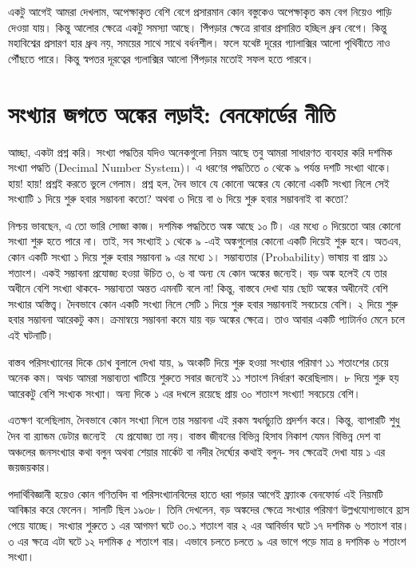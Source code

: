 \documentclass[
]{book}
\begin{document}
একটু আগেই আমরা দেখলাম, অপেক্ষাকৃত বেশি বেগে প্রসারমান কোন বস্তুকেও অপেক্ষাকৃত কম বেগ নিয়েও পাড়ি দেওয়া যায়। কিন্তু আলোর ক্ষেত্রে একটু সমস্যা আছে। পিঁপড়ার ক্ষেত্রে রাবার প্রসারিত হচ্ছিল ধ্রুব বেগে। কিন্তু মহাবিশ্বের প্রসারণ হার ধ্রুব নয়, সময়ের সাথে সাথে বর্ধনশীল। ফলে যথেষ্ট দূরের গ্যালাক্সির আলো পৃথিবীতে নাও পৌঁছতে পারে। কিন্তু স্বপতর দূরত্বের গ্যলাক্সির আলো পিঁপড়ার মতোই সফল হতে পারবে।

\hypertarget{benford}{%
\chapter{সংখ্যার জগতে অঙ্কের লড়াই: বেনফোর্ডের নীতি}\label{benford}}

আচ্ছা, একটা প্রশ্ন করি। সংখ্যা পদ্ধতির যদিও অনেকগুলো নিয়ম আছে তবু আমরা সাধারণত ব্যবহার করি দশমিক সংখ্যা পদ্ধতি (Decimal Number System)। এ ধরণের পদ্ধতিতে ০ থেকে ৯ পর্যন্ত দশটি সংখ্যা থাকে। হায়! হায়! প্রশ্নই করতে ভুলে গেলাম। প্রশ্ন হল, দৈব ভাবে যে কোনো অঙ্কের যে কোনো একটি সংখ্যা নিলে সেই সংখ্যাটি ১ দিয়ে শুরু হবার সম্ভাবনা কতো? অথবা ৩ দিয়ে বা ৬ দিয়ে শুরু হবার সম্ভাবনাই বা কতো?

নিশ্চয় ভাবছেন, এ তো ভারি সোজা কাজ। দশমিক পদ্ধতিতে অঙ্ক আছে ১০ টি। এর মধ্যে ০ দিয়েতো আর কোনো সংখ্যা শুরু হতে পারে না। তাই, সব সংখ্যাই ১ থেকে ৯ -এই অঙ্কগুলোর কোনো একটি দিয়েই শুরু হবে। অতএব, কোন একটি সংখ্যা ১ দিয়ে শুরু হবার সম্ভাবনা ৯ এর মধ্যে ১। সম্ভাব্যতার (Probability) ভাষায় বা প্রায় ১১ শতাংশ। একই সম্ভাবনা প্রযোজ্য হওয়া উচিত ৩, ৬ বা অন্য যে কোন অঙ্কের জন্যেই। বড় অঙ্ক হলেই যে তার অধীনে বেশি সংখ্যা থাকবে- সম্ভাব্যতা অন্তত এমনটি বলে না!
কিন্তু, বাস্তবে দেখা যায় ছোট অঙ্কের অধীনেই বেশি সংখ্যার অস্তিত্ত্ব। দৈবভাবে কোন একটি সংখ্যা নিলে সেটি ১ দিয়ে শুরু হবার সম্ভাবনাই সবচেয়ে বেশি। ২ দিয়ে শুরু হবার সম্ভাবনা আরেকটু কম। ক্রমান্বয়ে সম্ভাবনা কমে যায় বড় অঙ্কের ক্ষেত্রে। তাও আবার একটি প্যাটার্নও মেনে চলে এই ঘটনাটি।~

বাস্তব পরিসংখ্যানের দিকে চোখ বুলালে দেখা যায়, ৯ অংকটি দিয়ে শুরু হওয়া সংখ্যার পরিমাণ ১১ শতাংশের চেয়ে অনেক কম। অথচ আমরা সম্ভাব্যতা খাটিয়ে শুরুতে সবার জন্যেই ১১ শতাংশ নির্ধারণ করেছিলাম। ৮ দিয়ে শুরু হয় আরেকটু বেশি সংখ্যক সংখ্যা। অন্য দিকে ১ এর দখলে রয়েছে প্রায় ৩০ শতাংশ সংখ্যা! সবচেয়ে বেশি।

এতক্ষণ বলেছিলাম, দৈবভাবে কোন সংখ্যা নিলে তার সম্ভাবনা এই রকম স্বধর্মচ্যুতি প্রদর্শন করে। কিন্তু, ব্যাপারটি শুধু দৈব বা র‍্যান্ডম ডেটার জন্যেই~ যে প্রযোজ্য তা নয়। বাস্তব জীবনের বিভিন্ন হিসাব নিকাশ যেমন বিভিন্ন দেশ বা অঞ্চলের জনসংখ্যার কথা বলুন অথবা শেয়ার মার্কেট বা নদীর দৈর্ঘ্যের কথাই বলুন- সব ক্ষেত্রেই দেখা যায় ১ এর জয়জয়কার।~

পদার্থিবিজ্ঞানী হয়েও কোন গণিতবিদ বা পরিসংখ্যানবিদের হাতে ধরা পড়ার আগেই ফ্র্যাংক বেনফোর্ড এই নিয়মটি আবিষ্কার করে ফেলেন। সালটি ছিল ১৯৩৮। তিনি দেখলেন, বড় অঙ্কদের ক্ষেত্রে সংখ্যার পরিমাণ উল্লখযোগ্যভাবে হ্রাস পেয়ে যাচ্ছে। সংখ্যার শুরুতে ১ এর আগমণ ঘটে ৩০.১ শতাংশ বার ২ এর আবির্ভাব ঘটে ১৭ দশমিক ৬ শতাংশ বার। ৩ এর ক্ষত্রে এটা ঘটে ১২ দশমিক ৫ শতাংশ বার। এভাবে চলতে চলতে ৯ এর ভাগে পড়ে মাত্র ৪ দশমিক ৬ শতাংশ সংখ্যা।~
\end{document}
